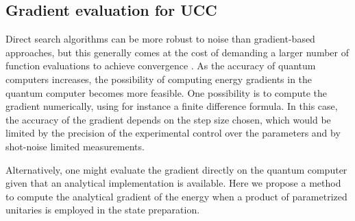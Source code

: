 \documentclass[superscriptaddress,aps,pra,twocolumn,nofootinbib,babel]{revtex4-1}
\begin{document}
\subsection{Gradient evaluation for UCC}\label{sec:UCCderivatives}

Direct search algorithms can be more robust to noise than gradient-based approaches, but this generally comes at the cost of demanding a larger number of function evaluations to achieve convergence \cite{kolda.SIAMR.45.385.2003}. As the accuracy of quantum computers increases, the possibility of computing energy gradients in the quantum computer becomes more feasible. One possibility is to compute the gradient numerically, using for instance a finite difference formula. In this case, the accuracy of the gradient depends on the step size chosen, which would be limited by the precision of the experimental control over the parameters and by shot-noise limited measurements. 

Alternatively, one might evaluate the gradient directly on the quantum computer given that an analytical implementation is available. Here we propose a method to compute the analytical gradient of the energy when a product of parametrized unitaries is employed in the state preparation. 
\end{document}
